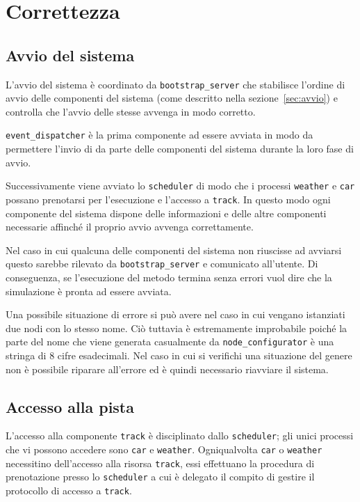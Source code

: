 \chapter{Correttezza}
\section{Avvio del sistema}
L'avvio del sistema è coordinato da \texttt{bootstrap\_server} che stabilisce l'ordine di avvio delle componenti del sistema (come descritto nella sezione~\ref{sec:avvio}) e controlla che l'avvio delle stesse avvenga in modo corretto.

\texttt{event\_dispatcher} è la prima componente ad essere avviata in modo da permettere l'invio di  da parte delle componenti del sistema durante la loro fase di avvio.

Successivamente viene avviato lo \texttt{scheduler} di modo che i processi \texttt{weather} e \texttt{car} possano prenotarsi per l'esecuzione e l'accesso a \texttt{track}. In questo modo ogni componente del sistema dispone delle informazioni e delle altre componenti necessarie affinché il proprio avvio avvenga correttamente.

Nel caso in cui qualcuna delle componenti del sistema non riuscisse ad avviarsi questo sarebbe rilevato da \texttt{bootstrap\_server} e comunicato all'utente. Di conseguenza, se l'esecuzione del metodo  termina senza errori vuol dire che la simulazione è pronta ad essere avviata.

Una possibile situazione di errore si può avere nel caso in cui vengano istanziati due nodi \Erlang{} con lo stesso nome. Ciò tuttavia è estremamente improbabile poiché la parte del nome che viene generata casualmente da \texttt{node\_configurator} è una stringa di 8 cifre esadecimali. Nel caso in cui si verifichi una situazione del genere non è possibile riparare all'errore ed è quindi necessario riavviare il sistema.

\section{Accesso alla pista}
L'accesso alla componente \texttt{track} è disciplinato dallo \texttt{scheduler}; gli unici processi che vi possono accedere sono \texttt{car} e \texttt{weather}. Ogniqualvolta \texttt{car} o \texttt{weather} necessitino dell'accesso alla risorsa \texttt{track}, essi effettuano la procedura di prenotazione presso lo \texttt{scheduler} a cui è delegato il compito di gestire il protocollo di accesso a \texttt{track}.

